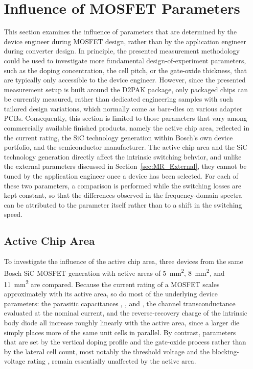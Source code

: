 \section{Influence of MOSFET Parameters}
\label{sec:MR_MOSFET}

This section examines the influence of parameters that are determined by the device engineer during MOSFET design, rather than by the application engineer during converter design.
In principle, the presented measurement methodology could be used to investigate more fundamental design-of-experiment parameters, such as the doping concentration, the cell pitch, or the gate-oxide thickness, that are typically only accessible to the device engineer.
However, since the presented measurement setup is built around the D2PAK package, only packaged chips can be currently measured, rather than dedicated engineering samples with such tailored design variations, which normally come as bare-dies on various adapter PCBs.
Consequently, this section is limited to those parameters that vary among commercially available finished products, namely the active chip area, reflected in the current rating, the SiC technology generation within Bosch's own device portfolio, and the semiconductor manufacturer.
The active chip area and the SiC technology generation directly affect the intrinsic switching behvior, and unlike the external parameters discussed in Section~\ref{sec:MR_External}, they cannot be tuned by the application engineer once a device has been selected.
For each of these two parameters, a comparison is performed while the switching losses are kept constant, so that the differences observed in the frequency-domain spectra can be attributed to the parameter itself rather than to a shift in the switching speed.

\subsection{Active Chip Area}

To investigate the influence of the active chip area, three devices from the same Bosch SiC MOSFET generation with active areas of \SI{5}{mm^2}, \SI{8}{mm^2}, and \SI{11}{mm^2} are compared.
Because the current rating of a MOSFET scales approximately with its active area, so do most of the underlying device parameters: the parasitic capacitances , , and , the channel transconductance  evaluated at the nominal current, and the reverse-recovery charge  of the intrinsic body diode all increase roughly linearly with the active area, since a larger die simply places more of the same unit cells in parallel.
By contrast, parameters that are set by the vertical doping profile and the gate-oxide process rather than by the lateral cell count, most notably the threshold voltage  and the blocking-voltage rating , remain essentially unaffected by the active area.

